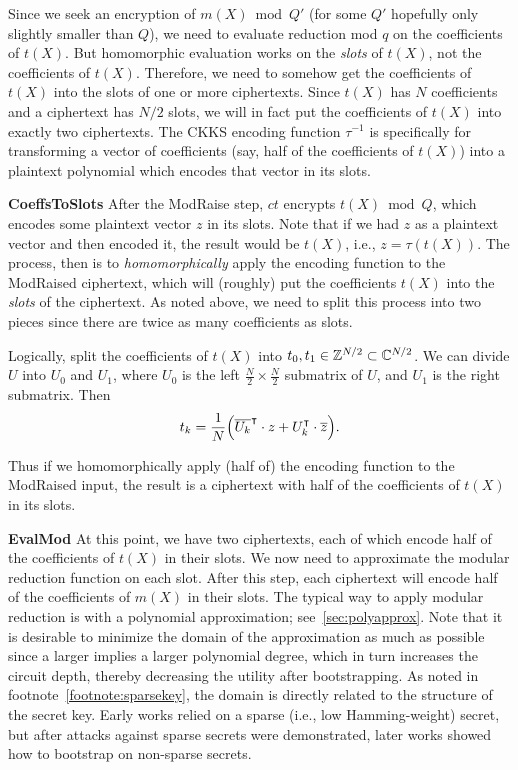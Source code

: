 \documentclass[../fheimpl.tex]{subfiles}
\begin{document}
    Since we seek an encryption of $m(X) \bmod Q'$ (for some $Q'$ hopefully only slightly smaller than $Q$), we need to evaluate reduction mod $q$ on the coefficients of $t(X)$. But homomorphic evaluation works on the \emph{slots} of $t(X)$, not the coefficients of $t(X)$. Therefore, we need to somehow get the coefficients of $t(X)$ into the slots of one or more ciphertexts. Since $t(X)$ has $N$ coefficients and a ciphertext has $N/2$ slots, we will in fact put the coefficients of $t(X)$ into exactly two ciphertexts. The CKKS encoding function $\tau^{-1}$ is specifically for transforming a vector of coefficients (say, half of the coefficients of $t(X)$) into a plaintext polynomial which encodes that vector in its slots.  
    
    \textbf{CoeffsToSlots} After the ModRaise step, $ct$ encrypts $t(X)\bmod Q$, which encodes some plaintext vector $z$ in its slots. Note that if we had $z$ as a plaintext vector and then encoded it, the result would be $t(X)$, i.e., $z=\tau(t(X))$. The process, then is to \emph{homomorphically} apply the encoding function to the ModRaised ciphertext, which will (roughly) put the coefficients $t(X)$ into the \emph{slots} of the ciphertext. As noted above, we need to split this process into two pieces since there are twice as many coefficients as slots. 
    
    Logically, split the coefficients of $t(X)$ into $t_0, t_1\in\mathbb{Z}^{N/2}\subset\mathbb{C}^{N/2}$. We can divide $U$ into $U_0$ and $U_1$, where $U_0$ is the left $\frac{N}{2}\times\frac{N}{2}$ submatrix of $U$, and $U_1$ is the right submatrix. Then
    \[t_k = \frac{1}{N}\parens*{\overline{U_k}^\intercal\cdot z + U_k^\intercal\cdot\overline{z}}.\]
    
    Thus if we homomorphically apply (half of) the encoding function to the ModRaised input, the result is a ciphertext with half of the coefficients of $t(X)$ in its slots.
    
    \textbf{EvalMod} At this point, we have two ciphertexts, each of which encode half of the coefficients of $t(X)$ in their slots. We now need to approximate the modular reduction function on each slot. After this step, each ciphertext will encode half of the coefficients of $m(X)$ in their slots. The typical way to apply modular reduction is with a polynomial approximation; see~\cref{sec:polyapprox}. 
    Note that it is desirable to minimize the domain of the approximation as much as possible since a larger implies a larger polynomial degree, which in turn increases the circuit depth, thereby decreasing the utility after bootstrapping. As noted in footnote~\ref{footnote:sparsekey}, the domain is directly related to the structure of the secret key. Early works relied on a sparse (i.e., low Hamming-weight) secret, but after attacks against sparse secrets were demonstrated, later works showed how to bootstrap on non-sparse secrets.
    
\end{document}
